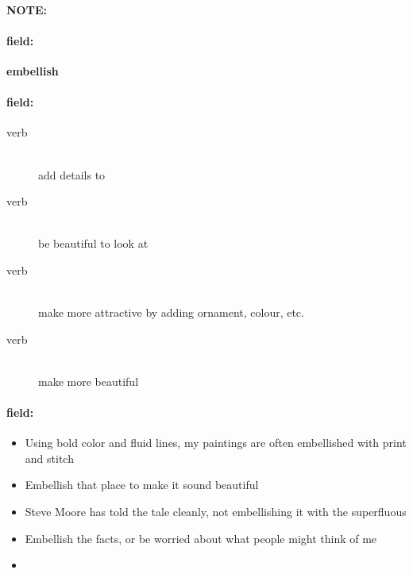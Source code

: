 \documentclass[12pt]{article}
\newenvironment{note}{\paragraph{NOTE:}}{}
\newenvironment{field}{\paragraph{field:}}{}
\begin{document}
\begin{note}
\begin{field}
\textbf{\large embellish}
\end{field}


\begin{field}
\begin{description}
\item[verb] \hfill \\ 
add details to

\item[verb] \hfill \\ 
be beautiful to look at

\item[verb] \hfill \\ 
make more attractive by adding ornament, colour, etc.

\item[verb] \hfill \\ 
make more beautiful

\end{description}
\end{field}

\begin{field}
\begin{itemize}
\item Using bold color and fluid lines, my paintings are often embellished with print and stitch
\item Embellish that place to make it sound beautiful
\item Steve Moore has told the tale cleanly, not embellishing it with the superfluous
\item Embellish the facts, or be worried about what people might think of me
\item 
\end{itemize}
\end{field}
\end{note}
\end{document}
